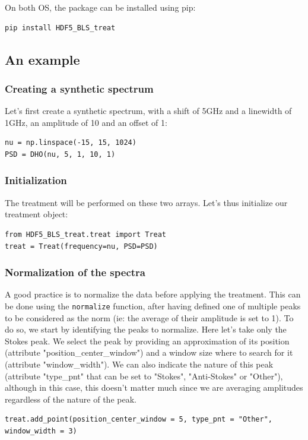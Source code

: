 \documentclass{article}
\begin{document}
On both OS, the package can be installed using pip:
\begin{lstlisting}
pip install HDF5_BLS_treat
\end{lstlisting}

\subsection{An example}

\subsubsection{Creating a synthetic spectrum}

Let's first create a synthetic spectrum, with a shift of 5GHz and a linewidth of 1GHz, an amplitude of 10 and an offset of 1:
\begin{lstlisting}
nu = np.linspace(-15, 15, 1024)
PSD = DHO(nu, 5, 1, 10, 1)
\end{lstlisting}


\subsubsection{Initialization}

The treatment will be performed on these two arrays. Let's thus initialize our treatment object:
\begin{lstlisting}
from HDF5_BLS_treat.treat import Treat
treat = Treat(frequency=nu, PSD=PSD)
\end{lstlisting}


\subsubsection{Normalization of the spectra}

A good practice is to normalize the data before applying the treatment. This can be done using the \texttt{normalize} function, after having defined one of multiple peaks to be considered as the norm (ie: the average of their amplitude is set to 1). To do so, we start by identifying the peaks to normalize. Here let's take only the Stokes peak. We select the peak by providing an approximation of its position (attribute "position\_center\_window") and a window size where to search for it  (attribute "window\_width"). We can also indicate the nature of this peak (attribute "type\_pnt" that can be set to "Stokes", "Anti-Stokes" or "Other"), although in this case, this doesn't matter much since we are averaging amplitudes regardless of the nature of the peak.
\begin{lstlisting}
treat.add_point(position_center_window = 5, type_pnt = "Other", window_width = 3)
\end{lstlisting}
\end{document}
